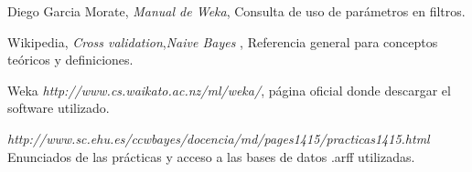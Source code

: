 \documentclass[es]{ifirak}
\begin{document}
\begin{thebibliography}{arauak}


Diego Garcia Morate, \emph{Manual de Weka}, Consulta de uso de parámetros en filtros.

 Wikipedia, \emph{Cross validation},\emph{Naive Bayes} , Referencia general para conceptos teóricos y definiciones.

 Weka \emph{http://www.cs.waikato.ac.nz/ml/weka/}, página oficial donde descargar el software utilizado.


 \emph{http://www.sc.ehu.es/ccwbayes/docencia/md/pages1415/practicas1415.html} Enunciados de las prácticas y acceso a las bases de datos .arff utilizadas.

\end{thebibliography}
\end{document}
